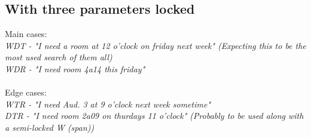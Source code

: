 \subsection*{With three parameters locked}
Main cases: \\ \emph{
WDT - "I need a room at 12 o'clock on friday next week" (Expecting this to be the most used search of them all) \\
WDR - "I need room 4a14 this friday" \\
}\\
\noindent Edge cases: \\ \emph{
WTR - "I need Aud. 3 at 9 o'clock next week sometime" \\
DTR - "I need room 2a09 on thurdays 11 o'clock" (Probably to be used along with a semi-locked W (span)) \\
}